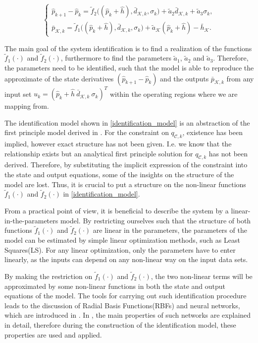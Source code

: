 \begin{equation}
\begin{cases}
  \label{identification_model}
    \hat{p}_{k+1} - \hat{p}_k = \tilde{f}_2 \big((\hat{p}_k + \hat{h}),\bar{d}_{\mathcal{K},k}, \sigma_k\big) + \tilde{a}_2 \bar{d}_{\mathcal{K},k} + \tilde{a}_3 \sigma_k,\\
  \bar{p}_{\mathcal{K},k}  = \tilde{f}_1 \big((\hat{p}_k + \hat{h}),\bar{d}_{\mathcal{K},k}, \sigma_k\big) + \tilde{a}_{\mathcal{K}} (\hat{p}_k + \hat{h}) - \bar{h}_{\mathcal{K}}.
  \end{cases}
\end{equation} 

The main goal of the system identification is to find a realization of the functions $\tilde{f}_1(\cdot)$ and $\tilde{f}_2(\cdot)$, furthermore to find the parameters $\tilde{a}_1$, $\tilde{a}_2$ and $\tilde{a}_3$. Therefore, the parameters need to be identified, such that the model is able to reproduce the approximate of the state derivatives $(\hat{p}_{k+1} - \hat{p}_k)$ and the outputs $\bar{p}_{\mathcal{K},k}$ from any input set $u_k = ( \hat{p}_k+\hat{h} \ \bar{d}_{\mathcal{K},k} \ \sigma_k )^T$ within the operating regions where we are mapping from.

The identification model shown in \eqref{identification_model} is an abstraction of the first principle model derived in . For the constraint on $q_{\mathcal{C},k}$, existence has been implied, however exact structure has not been given. I.e. we know that the relationship exists but an analytical first principle solution for $q_{\mathcal{C},k}$ has not been derived. Therefore, by substituting the implicit expression of the constraint into the state and output equations, some of the insights on the structure of the model are lost. Thus, it is crucial to put a structure on the non-linear functions $\tilde{f}_1(\cdot)$ and $\tilde{f}_2(\cdot)$ in \eqref{identification_model}. 

From a practical point of view, it is beneficial to describe the system by a linear-in-the-parameters model. By restricting ourselves such that the structure of both functions $\tilde{f}_1(\cdot)$ and $\tilde{f}_2(\cdot)$ are linear in the parameters, the parameters of the model can be estimated by simple linear optimization methods, such as Least Squares(LS). For any linear optimization, only the parameters have to enter linearly, as the inputs can depend on any non-linear way on the input data sets. 

By making the restriction on $\tilde{f}_1(\cdot)$ and $\tilde{f}_2(\cdot)$, the two non-linear terms will be approximated by some non-linear functions in both the state and output equations of the model. The tools for carrying out such identification procedure leads to the discussion of Radial Basis Functions(RBFs) and neural networks, which are introduced in . In , the main properties of such networks are explained in detail, therefore during the construction of the identification model, these properties are used and applied. 

